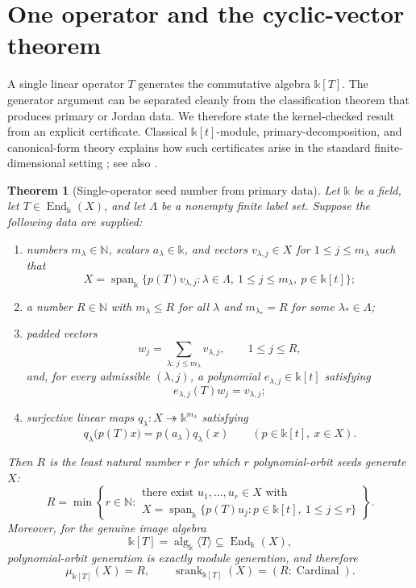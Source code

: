 \documentclass[11pt]{article}
\newtheorem{theorem}{Theorem}[section]
\theoremstyle{definition}
\theoremstyle{remark}
\newcommand{\srank}{\operatorname{srank}}
\newcommand{\Span}{\operatorname{span}}
\newcommand{\End}{\operatorname{End}}
\newcommand{\bbk}{\mathbb{k}}
\newcommand{\N}{\mathbb N}
\begin{document}
\section{One operator and the cyclic-vector theorem}

A single linear operator $T$ generates the commutative algebra $\bbk[T]$.
The generator argument can be separated cleanly from the classification
theorem that produces primary or Jordan data.  We therefore state the
kernel-checked result from an explicit certificate.  Classical
$\bbk[t]$-module, primary-decomposition, and canonical-form theory explains
how such certificates arise in the standard finite-dimensional setting
\cite{roman2008}; see also \cite{hornJohnson2012}.

\begin{theorem}[Single-operator seed number from primary data]
\label{thm:single-operator}
Let $\bbk$ be a field, let $T\in\End_{\bbk}(X)$, and let $\Lambda$ be a
nonempty finite label set.  Suppose the following data are supplied:
\begin{enumerate}[label=(\roman*)]
\item numbers $m_{\lambda}\in\N$, scalars $a_{\lambda}\in\bbk$, and vectors
$v_{\lambda,j}\in X$ for $1\le j\le m_{\lambda}$ such that
\[
X=\Span_{\bbk}\{p(T)v_{\lambda,j}:
  \lambda\in\Lambda,\ 1\le j\le m_{\lambda},\ p\in\bbk[t]\};
\]
\item a number $R\in\N$ with $m_{\lambda}\le R$ for all $\lambda$ and
$m_{\lambda_*}=R$ for some $\lambda_*\in\Lambda$;
\item padded vectors
\[
w_j=\sum_{\lambda:\,j\le m_{\lambda}}v_{\lambda,j},
\qquad 1\le j\le R,
\]
and, for every admissible $(\lambda,j)$, a polynomial
$e_{\lambda,j}\in\bbk[t]$ satisfying
\[
e_{\lambda,j}(T)w_j=v_{\lambda,j};
\]
\item surjective linear maps
$q_{\lambda}:X\twoheadrightarrow\bbk^{m_{\lambda}}$ satisfying
\[
q_{\lambda}\bigl(p(T)x\bigr)
=p(a_{\lambda})q_{\lambda}(x)
\qquad(p\in\bbk[t],\ x\in X).
\]
\end{enumerate}
Then $R$ is the least natural number $r$ for which $r$ polynomial-orbit
seeds generate $X$:
\[
{
R=\min\left\{r\in\N:
\begin{array}{l}
\text{there exist }u_1,\ldots,u_r\in X\text{ with}\\[2pt]
X=\Span_{\bbk}\{p(T)u_j:p\in\bbk[t],\ 1\le j\le r\}
\end{array}
\right\}.
}
\]
Moreover, for the genuine image algebra
\[
\bbk[T]=\operatorname{alg}_{\bbk}\langle T\rangle
\subseteq\End_{\bbk}(X),
\]
polynomial-orbit generation is exactly module generation, and therefore
\[
{
\mu_{\bbk[T]}(X)=R,
\qquad
\srank_{\bbk[T]}(X)=(R:\operatorname{Cardinal}).
}
\]
\end{theorem}
\end{document}
